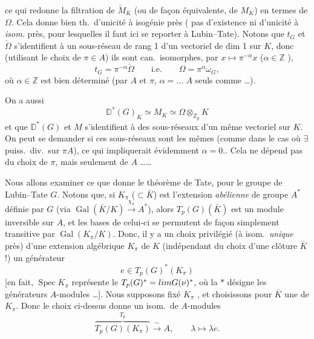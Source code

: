 \documentclass[11pt,a4paper]{article}
\begin{document}

ce qui redonne la filtration de $\check{M}_K$ (ou de façon équivalente, de
$M_K$) en termes de $\Omega$. Cela donne bien th.\ d'unicité à isogénie
près ( pas d'existence ni d'unicité à \emph{isom.} près,
pour lesquelles il faut ici se reporter à Lubin--Tate). Notons que $t_G$ et
$\check{\Omega}$ s'identifient à un sous-réseau de rang 1 \ill{} d'un
vectoriel de dim 1 sur $K$, donc (utilisant le choix de $\pi \in A$) ils
sont can.\ isomorphes, \struck{\ill{}} par $x \mapsto \pi^{-\alpha} x$
($\alpha \in \mathbb{Z}$ \ill{}),
\[
t_G = \pi^{-\alpha} \check{\Omega} \qquad \text{i.e.} \qquad \Omega = \pi^{\alpha} \omega_G,
\]
 où $\alpha \in \mathbb{Z}$ est bien déterminé (par $A$ et
$\pi$, $\alpha = \ldots$ \ill{} $A$  seuls comme \ill{} \ill{}
\ldots).

On a aussi
\[
\mathbb{D}^*(G)_K \simeq M_K \simeq \Omega \otimes_{\mathbb{Z}_p} K
\]
et  que $\mathbb{D}^*(G)$ et $M$ s'identifient à des
sous-réseaux d'un même vectoriel sur $K$. On peut se demander si ces
sous-réseaux sont les mêmes (comme dans le cas où $\exists$ puiss.\ div.\
sur $\pi A$), ce qui impliquerait évidemment $\alpha = 0$.. Cela ne dépend
pas du choix de $\pi$, mais seulement de $A$ \ldots\ldots


Nous allons examiner \struck{\ill{}} ce que donne le théorème de Tate, pour
le groupe de Lubin--Tate $G$. Notons que, si $K_\pi$ ($\subset \bar{K}$) est
l'extension \emph{abélienne} de groupe $A^*$ définie par $G$ (via
$\operatorname{Gal}(\bar{K}/K) \xrightarrow{\chi_\pi} A^*$), alors
\struck{\ill{}} $T_p(G)(\bar{K})$ est un module inversible sur $A$, et les
bases de celui-ci se permutent de façon simplement transitive par
$\operatorname{Gal}(K_\pi/K)$. Donc, il y a un choix privilégié (à isom.\
\emph{unique} près) d'une extension algébrique $K_\pi$ de $K$ (indépendant
du choix d'une clôture $\bar{K}$ !) \uncertain{avec} un générateur
\[
e \in T_p(G)^*(K_\pi)
\]
[en fait, $\operatorname{Spec} K_\pi$ représente le 
$T_p(G)^* = \varprojlim G(\nu)^*$, où la $*$ désigne les générateurs
\struck{\ill{}} $A$-modules \ldots]. Nous supposons fixé $K_\pi$
\uncertain{de cette} \uncertain{façon}, et choisissons pour $\bar{K}$ une
\uncertain{sur-extension} de $K_\pi$. Donc le choix \struck{\ill{}} ci-dessus
donne un isom.\ de $A$-modules
\[
\overbrace{T_p(G)(K_\pi)}^{T_p} \xrightarrow{\ \sim\ } A, \qquad \lambda \mapsto \lambda e .
\]
\end{document}
